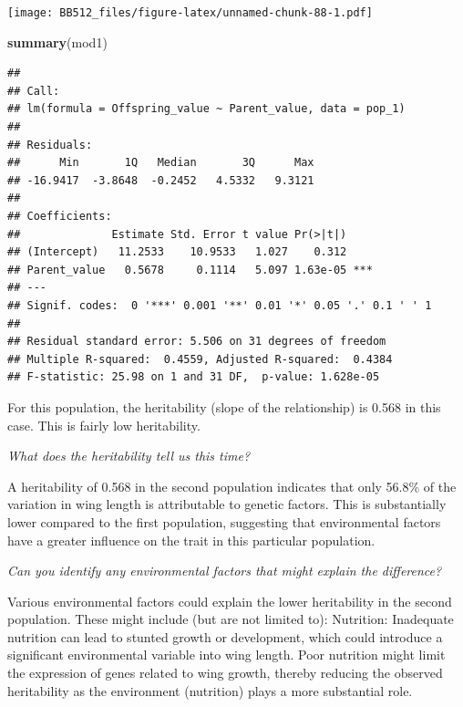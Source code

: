 \documentclass[
  a4paper]{book}
\newenvironment{Shaded}{\begin{snugshade}}{\end{snugshade}}
\newcommand{\FunctionTok}[1]{\textcolor[rgb]{0.13,0.29,0.53}{\textbf{#1}}}
\newcommand{\NormalTok}[1]{#1}
\begin{document}
\texttt{[image: BB512\_files/figure-latex/unnamed-chunk-88-1.pdf]}

\begin{Shaded}
\begin{Highlighting}[]
\FunctionTok{summary}\NormalTok{(mod1)}
\end{Highlighting}
\end{Shaded}

\begin{verbatim}
## 
## Call:
## lm(formula = Offspring_value ~ Parent_value, data = pop_1)
## 
## Residuals:
##      Min       1Q   Median       3Q      Max 
## -16.9417  -3.8648  -0.2452   4.5332   9.3121 
## 
## Coefficients:
##              Estimate Std. Error t value Pr(>|t|)    
## (Intercept)   11.2533    10.9533   1.027    0.312    
## Parent_value   0.5678     0.1114   5.097 1.63e-05 ***
## ---
## Signif. codes:  0 '***' 0.001 '**' 0.01 '*' 0.05 '.' 0.1 ' ' 1
## 
## Residual standard error: 5.506 on 31 degrees of freedom
## Multiple R-squared:  0.4559, Adjusted R-squared:  0.4384 
## F-statistic: 25.98 on 1 and 31 DF,  p-value: 1.628e-05
\end{verbatim}

For this population, the heritability (slope of the relationship) is 0.568 in this case. This is fairly low heritability.

\emph{What does the heritability tell us this time?}

A heritability of 0.568 in the second population indicates that only 56.8\% of the variation in wing length is attributable to genetic factors. This is substantially lower compared to the first population, suggesting that environmental factors have a greater influence on the trait in this particular population.

\emph{Can you identify any environmental factors that might explain the difference?}

Various environmental factors could explain the lower heritability in the second population. These might include (but are not limited to):
Nutrition: Inadequate nutrition can lead to stunted growth or development, which could introduce a significant environmental variable into wing length. Poor nutrition might limit the expression of genes related to wing growth, thereby reducing the observed heritability as the environment (nutrition) plays a more substantial role.
\end{document}
